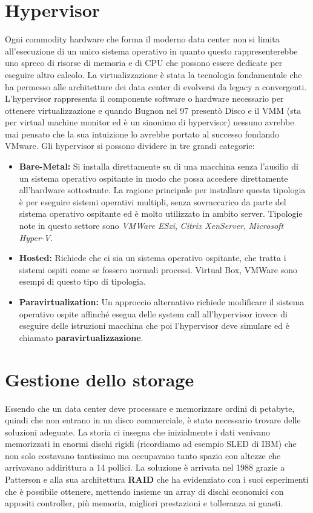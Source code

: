 \section{Hypervisor}
Ogni commodity hardware che forma il moderno data center non si limita all'esecuzione di un unico sistema operativo in quanto questo rappresenterebbe uno spreco di risorse di memoria e di CPU che possono essere dedicate per eseguire altro calcolo. La virtualizzazione è stata la tecnologia fondamentale che ha permesso alle architetture dei data center di evolversi da legacy a convergenti. L'hypervisor rappresenta il componente software o hardware necessario per ottenere virtualizzazione e quando Bugnon nel 97 presentò Disco\cite{bugnon97} e il VMM (sta per virtual machine monitor ed è un sinonimo di hypervisor) nessuno avrebbe mai pensato che la sua intuizione lo avrebbe portato al successo fondando VMware. Gli hypervisor si possono dividere in tre grandi categorie:
\begin{itemize}
	\item \textbf{Bare-Metal:} Si installa direttamente su di una macchina senza l'ausilio di un sistema operativo ospitante in modo che possa accedere direttamente all'hardware sottostante. La ragione principale per installare questa tipologia è per eseguire sistemi operativi multipli, senza sovraccarico da parte del sistema operativo ospitante ed è molto utilizzato in ambito server. Tipologie note in questo settore sono \textit{VMWare ESxi}, \textit{Citrix XenServer}, \textit{Microsoft Hyper-V}.
	\item \textbf{Hosted:} Richiede che ci sia un sistema operativo ospitante, che tratta i sistemi ospiti come se fossero normali processi. Virtual Box, VMWare sono esempi di questo tipo di tipologia.
	\item \textbf{Paravirtualization:} Un approccio alternativo richiede modificare il sistema operativo ospite affinché esegua delle system call all'hypervisor invece di eseguire delle istruzioni macchina che poi l'hypervisor deve simulare ed è chiamato \textbf{paravirtualizzazione}. 
\end{itemize} 
\section{Gestione dello storage}
Essendo che un data center deve processare e memorizzare ordini di petabyte, quindi che non entrano in un disco commerciale, è stato necessario trovare delle soluzioni adeguate. La storia ci insegna che inizialmente i dati venivano memorizzati in enormi dischi rigidi (ricordiamo ad esempio SLED di IBM) che non solo costavano tantissimo ma occupavano tanto spazio con altezze che arrivavano addirittura a 14 pollici. La soluzione è arrivata nel 1988 grazie a Patterson e alla sua architettura \textbf{RAID} che ha evidenziato con i suoi esperimenti\cite{patterson88} che è possibile ottenere, mettendo insieme un array di dischi economici con appositi controller, più memoria, migliori prestazioni e tolleranza ai guasti.
